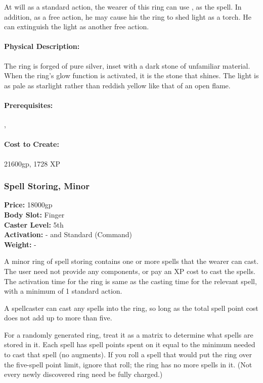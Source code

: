At will as a standard action, the wearer of this ring can use , as the spell. In addition, as a free action, he may cause his the ring to shed light as a torch. He can extinguish the light as another free action.

\paragraph{Physical Description:} The ring is forged of pure silver, inset with a dark stone of unfamiliar material. When the ring's glow function is activated, it is the stone that shines. The light is as pale as starlight rather than reddish yellow like that of an open flame.

\paragraph{Prerequisites:} , 

\paragraph{Cost to Create:} 21600gp, 1728 XP
\subsubsection{Spell Storing, Minor}
\label{Item:SpellStoringMinor}
   \textbf{Price:} 18000gp
\\ \textbf{Body Slot:} Finger
\\ \textbf{Caster Level:} 5th
\\ \textbf{Activation:} - and Standard (Command)
\\ \textbf{Weight:} -

A minor ring of spell storing contains one or more spells that the wearer can cast.  
The user need not provide any components, or pay an XP cost to cast the spells. 
The activation time for the ring is same as the casting time for the relevant spell, with a minimum of 1 standard action.

A spellcaster can cast any spells into the ring, so long as the total spell point cost does not add up to more than five. 

For a randomly generated ring, treat it as a matrix to determine what spells are stored in it. Each spell has spell points spent on it equal to the minimum needed to cast that spell (no augments).
If you roll a spell that would put the ring over the five-spell point limit, ignore that roll; the ring has no more spells in it. (Not every newly discovered ring need be fully charged.)

